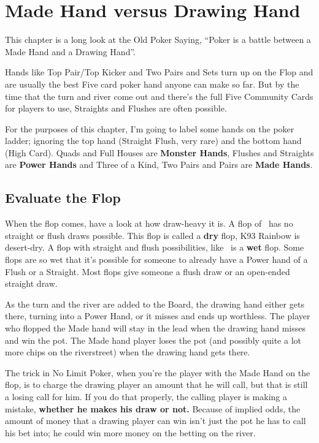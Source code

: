 \chapter{Made Hand versus Drawing Hand}


This chapter is a long look at the Old Poker Saying, ``Poker
is a battle between a Made Hand and a Drawing Hand''.

Hands like Top Pair/Top Kicker and Two Pairs and Sets turn up on the
Flop and are usually the best Five card poker hand anyone can
make so far. But by the time that the turn and river come out and
there's the full Five Community Cards for players to use, Straights
and Flushes are often possible.

For the purposes of this chapter, I'm going to label some hands on the
poker ladder; ignoring the top hand (Straight Flush, very rare) and
the bottom hand (High Card). Quads and Full Houses are \textbf{Monster
Hands}, Flushes and Straights are \textbf{Power Hands} and Three of a
Kind, Two Pairs and Pairs are \textbf{Made Hands}.


\section{Evaluate the Flop}

When the flop comes, have a look at how draw-heavy it is. A flop of
\Ks\nineh\trec\ has no straight or flush draws possible. This flop is
called a \textbf{dry} flop, K93 Rainbow is desert-dry. A flop with
straight and flush possibilities, like \tend\nined\sixh\ is a
\textbf{wet} flop. Some flops are so wet that it's possible for
someone to already have a Power hand of a Flush or a Straight. Most
flops give someone a flush draw or an open-ended straight draw.

As the turn and the river are added to the Board, the drawing hand
either gets there, turning into a Power Hand, or it misses and ends up
worthless. The player who flopped the Made hand will stay in the lead
when the drawing hand misses and win the pot. The Made hand player
loses the pot (and possibly quite a lot more chips on the riverstreet)
when the drawing hand gets there.

The trick in No Limit Poker, when you're the player with the Made Hand
on the flop, is to charge the drawing player an amount that he will
call, but that is still a losing call for him. If
you do that properly, the calling player is making a mistake,
\textbf{whether he makes his draw or not.} Because of implied odds,
the amount of money that a drawing player can win isn't just the pot
he has to call his bet into; he could win more money on the betting on
the river.

